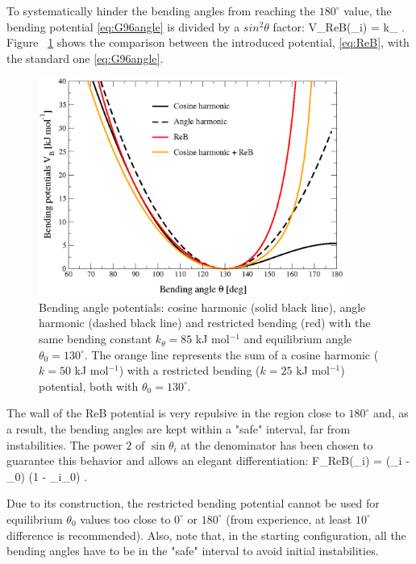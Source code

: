 To systematically hinder the bending angles from reaching the $180^{\circ}$ value, the bending potential  \ref{eq:G96angle} is divided by a $sin^2\theta$ factor:
%
\beq
V_{\rm ReB}(\theta_i) =  k_{\theta} .
\label{eq:ReB}
\eeq
%
Figure ~\ref{ReB} shows the comparison between the introduced potential, \ref{eq:ReB}, with the standard one \ref{eq:G96angle}.
%
\begin{figure}
\centerline{\includegraphics[width=10cm]{plots/fig-02}}
\vspace*{8pt}
\caption{Bending angle potentials: cosine harmonic (solid black line), angle harmonic (dashed black line) and restricted bending (red) with the same bending constant $k_{\theta}=85$ kJ mol$^{-1}$ and equilibrium angle $\theta_0=130^{\circ}$.
The orange line represents the sum of a cosine harmonic ($k =50$ kJ mol$^{-1}$) with a restricted bending ($k =25$ kJ mol$^{-1}$) potential,
both with $\theta_0=130^{\circ}$.}
\label{ReB}
\end{figure}
%
The wall of the ReB potential is very repulsive in the region close to $180^{\circ}$ and,
as a result, the bending angles are kept within a "safe" interval, far from instabilities.
The power $2$ of $\sin\theta_i$ at the denominator has been chosen to guarantee this behavior and allows an elegant differentiation:
%
\beq
F_{\rm ReB}(\theta_i) = (\cos\theta_i - \cos\theta_0) (1 - \cos\theta_i\cos\theta_0) .
\label{eq:diff_ReB}
\eeq
%

Due to its construction, the restricted bending potential cannot be used for equilibrium $\theta_0$ values too close to
$0^{\circ}$ or $180^{\circ}$ (from experience, at least $10^{\circ}$ difference is recommended).
Also, note that, in the starting configuration, all the bending angles have to be in the "safe" interval to avoid initial instabilities.

